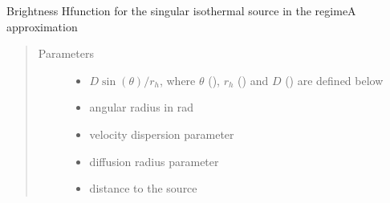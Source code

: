 \documentclass[letterpaper,10pt,english]{sphinxmanual}
\begin{document}

\begin{fulllineitems}
\label{\detokenize{diffsph.profiles:diffsph.profiles.analytics.sisbrA}}
\sphinxAtStartPar
Brightness H\sphinxhyphen{}function for the singular isothermal source in the regime\sphinxhyphen{}A approximation
\begin{quote}\begin{description}
\item[{Parameters}] \leavevmode\begin{itemize}
\item {} 
\sphinxAtStartPar
{} \textendash{} \(D\sin(\theta)/r_h\), where \(\theta\) (), \(r_h\) () and \(D\) () are defined below

\item {} 
\sphinxAtStartPar
{} \textendash{} angular radius in rad

\item {} 
\sphinxAtStartPar
{} \textendash{} velocity dispersion parameter

\item {} 
\sphinxAtStartPar
{} \textendash{} diffusion radius parameter

\item {} 
\sphinxAtStartPar
{} \textendash{} distance to the source

\end{itemize}

\end{description}\end{quote}

\end{fulllineitems}

\end{document}
